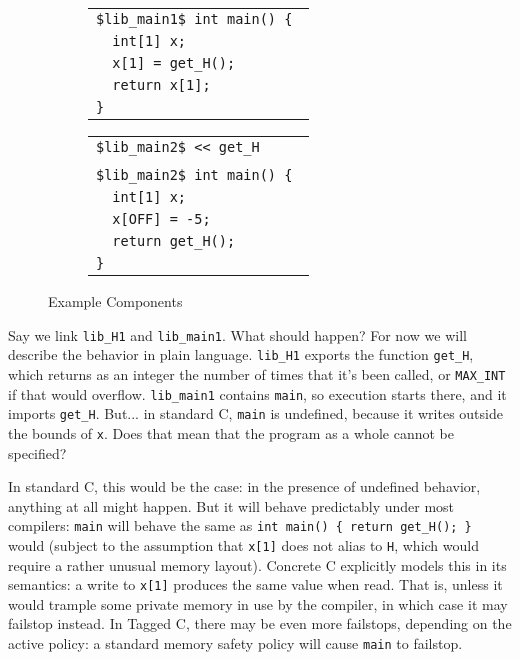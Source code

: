 \documentclass{article}
\begin{document}
\begin{figure}
\begin{subfigure}{0.33\textwidth}
{\begin{tabular}{l}
        \tt \$lib\_main1\$ int main() \{ \\
        \tt ~ int[1] x; \\
        \tt ~ x[1] = get\_H(); \\
        \tt ~ return x[1]; \\
        \tt \} \\
      \end{tabular}
    }
    \colorbox{gray!40}{
      \begin{tabular}{l}
        \tt \$lib\_main2\$ << get\_H \\ \\

        \tt \$lib\_main2\$ int main() \{ \\
        \tt ~ int[1] x; \\
        \tt ~ x[OFF] = -5; \\
        \tt ~ return get\_H(); \\
        \tt \} \\
      \end{tabular}
    }
  \end{subfigure}
  \caption{Example Components}
  \label{fig:components}
\end{figure}

\vspace{\belowdisplayskip}

Say we link {\tt lib\_H1} and {\tt lib\_main1}. What should happen?
For now we will describe the behavior in plain language. {\tt lib\_H1} exports the function
{\tt get\_H}, which returns as an integer the number of times that
it's been called, or {\tt MAX\_INT} if that would overflow. {\tt lib\_main1}
contains {\tt main}, so execution starts there, and it imports {\tt get\_H}. But...
in standard C, {\tt main} is undefined, because it writes outside the bounds of {\tt x}.
Does that mean that the program as a whole cannot be specified?

In standard C, this would be the case: in the presence of undefined behavior, anything
at all might happen. But it will behave predictably under most compilers: {\tt main} will behave
the same as  {\tt int main() \{ return get\_H(); \}} would (subject to the assumption that
{\tt x[1]} does not alias to {\tt H}, which would require a rather unusual memory layout). 
Concrete C explicitly models this in its semantics: a write to {\tt x[1]} produces
the same value when read. That is, unless it would trample some private memory in use by
the compiler, in which case it may failstop instead. In Tagged C, there may be even more
failstops, depending on the active policy: a standard memory safety policy will cause
{\tt main} to failstop.
\end{document}
